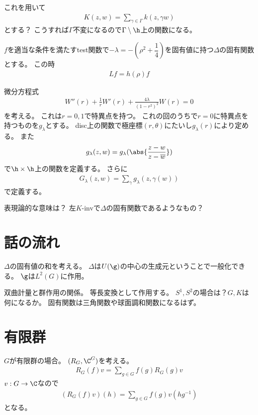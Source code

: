 \documentclass{jsarticle}
\begin{document}
これを用いて
\begin{align*}
K(z,w)=\sum_{\gamma\in\Gamma}k(z,\gamma w)
\end{align*}
とする？
こうすれば$\Gamma$不変になるので$\Gamma\setminus\h$上の関数になる。

\begin{prop}
$f$を適当な条件を満たすtest関数で$-\lambda=-(\rho^2+\dfrac{1}{4})$を固有値に持つ$\Delta$の固有関数とする。
この時
\begin{align*}
Lf=h(\rho)f
\end{align*}



\end{prop}
微分方程式
\begin{align*}
W''(r)+\frac{1}{r}W'(r)+\frac{4\lambda}{(1-r^2)^2}W(r)=0
\end{align*}
を考える。
これは$r=0,1$で特異点を持つ。
これの回のうちで$r=0$に特異点を持つものを$g_\lambda$とする。
disc上の関数で極座標$(r,\theta)$にたいし$g_\lambda(r)$により定める。
また
\begin{align*}
g_\lambda(z,w)=g_\lambda(\abs{\frac{z-w}{z-\overline{w}}})
\end{align*}
で$\h\times\h$上の関数を定義する。
さらに
\begin{align*}
G_\lambda(z,w)=\sum_\gamma g_\lambda(z,\gamma(w))
\end{align*}
で定義する。

表現論的な意味は？
左$K$-invで$\Delta$の固有関数であるようなもの？

\section{話の流れ}
$\Delta$の固有値の和を考える。
$\Delta$は$U(\g)$の中心の生成元ということで一般化できる。
$\g$は$L^2(G)$に作用。



双曲計量と群作用の関係。
等長変換として作用する。
$S^1, S^2$の場合は？$G, K$は何になるか。
固有関数は三角関数や球面調和関数になるはず。



\section{有限群}
$G$が有限群の場合。
$(R_G,\C^G)$を考える。
\begin{align*}
R_G(f)v=\sum_{g\in G}f(g)R_G(g)v
\end{align*}
$v:G\to \C$なので
\begin{align*}
(R_G(f)v)(h)=\sum_{g\in G}f(g)v(hg^{-1})
\end{align*}
となる。
\end{document}
